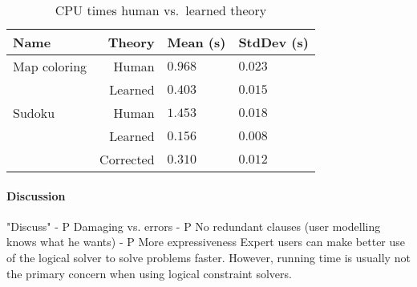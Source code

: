 \begin{experiment}[\textsc{Speed}]


	\begin{table}[!htp]
		\begin{tabularx}{\textwidth}{lr|XX}
			\textbf{Name} & \textbf{Theory} & \textbf{Mean (s)} & \textbf{StdDev (s)} \\
			\toprule
			Map coloring & Human & $0.968$ & $0.023$ \\
			& Learned & $0.403$ & $0.015$ \\
			\midrule
			Sudoku & Human & $1.453$ & $0.018$ \\ 
			& Learned & $0.156$ & $0.008$ \\
			& Corrected & $0.310$ & $0.012$
		\end{tabularx}
		\label{tbl:speed_human_machine}
		\caption{CPU times human vs.~learned theory}
	\end{table}

\end{experiment}

\paragraph{Discussion}
"Discuss"
 - P Damaging vs. errors
 - P No redundant clauses (user modelling knows what he wants)
 - P More expressiveness
Expert users can make better use of the logical solver to solve problems faster.
However, running time is usually not the primary concern when using logical constraint solvers.


